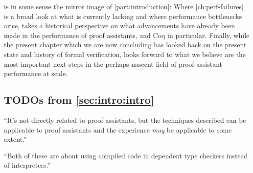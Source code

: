  is in some sense the mirror image of \autoref{part:introduction}:
Where \autoref{ch:perf-failures} is a broad look at what is currently lacking and where performance bottlenecks arise,  takes a historical perspective on what advancements have already been made in the performance of proof assistants, and Coq in particular.
Finally, while the present chapter which we are now concluding has looked back on the present state and history of formal verification,  looks forward to what we believe are the most important next steps in the perhaps-nascent field of proof-assistant performance at scale.

\begin{subappendices}

\begin{minorcomment}
\section{TODOs from \autoref{sec:intro:intro}}
\end{minorcomment}
\begin{minorcomment}
  ``It's not directly related to proof assistants, but the techniques described can be applicable to proof assistants and the experience \emph{may} be applicable to some extent.''
\end{minorcomment}
\begin{minorcomment}
``Both of these are about using compiled code in dependent type checkers instead of interpreters.''
\end{minorcomment}


\end{subappendices}
